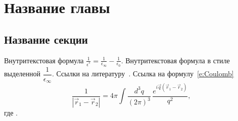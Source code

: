 \chapter{Название главы}
\section{Название секции}

Внутритекстовая формула $\frac{1}{\epsilon^*}=\frac{1}{\epsilon_\infty}-\frac{1}{\epsilon_0}$.
Внутритекстовая формула в стиле выделенной $\dfrac{1}{\epsilon_\infty}$.
Ссылки на литературу~\cite{Yoffe_1993_AP_42_173,Efros_1982_FTP_16_7_1209,%
Anselm_1978,Segall_1968,Agranovich_1983,InP,Mishchenko_1996,Skvortsov_2008,%
Perelman_2003_math:0307245,Nielsen_2010_1006.2735,patent1,patent2}.
Ссылка на формулу~\eqref{e:Coulomb}
\begin{equation}\label{e:Coulomb}
  \frac{1}{|\vec r_1 - \vec r_2|} =
  4\pi \int \frac{d^3 q}{(2\pi)^3}\,
  \frac{e^{i\vec q(\vec r_1 - \vec r_2)}}{q^2},
\end{equation}
где .
